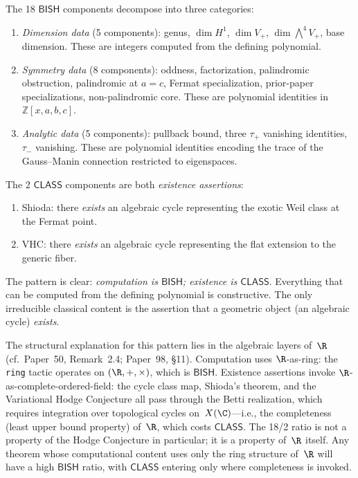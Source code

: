 \documentclass[11pt]{article}
\theoremstyle{plain}
\theoremstyle{definition}
\theoremstyle{remark}
\newcommand{\ZZ}{\mathbb{Z}}
\newcommand{\BISH}{\mathsf{BISH}}
\newcommand{\CLASS}{\mathsf{CLASS}}
\begin{document}
The 18 $\BISH$ components decompose into three categories:
\begin{enumerate}[label=(\roman*),nosep]
\item \emph{Dimension data} (5 components): genus, $\dim H^1$,
  $\dim V_+$, $\dim \bigwedge^4 V_+$, base dimension.  These are
  integers computed from the defining polynomial.
\item \emph{Symmetry data} (8 components): oddness, factorization,
  palindromic obstruction, palindromic at $a = c$, Fermat
  specialization, prior-paper specializations, non-palindromic core.
  These are polynomial identities in $\ZZ[x,a,b,c]$.
\item \emph{Analytic data} (5 components): pullback bound, three
  $\tau_+$ vanishing identities, $\tau_-$ vanishing.  These are
  polynomial identities encoding the trace of the Gauss--Manin
  connection restricted to eigenspaces.
\end{enumerate}

The 2 $\CLASS$ components are both \emph{existence assertions}:
\begin{enumerate}[label=(\roman*),nosep]
\item Shioda: there \emph{exists} an algebraic cycle representing
  the exotic Weil class at the Fermat point.
\item VHC: there \emph{exists} an algebraic cycle representing
  the flat extension to the generic fiber.
\end{enumerate}

The pattern is clear: \emph{computation is $\BISH$; existence is
$\CLASS$}.  Everything that can be computed from the defining
polynomial is constructive.  The only irreducible classical content
is the assertion that a geometric object (an algebraic cycle)
\emph{exists}.

The structural explanation for this pattern lies in the algebraic
layers of~$\R$ (cf.\ Paper~50, Remark~2.4; Paper~98, \S11).
Computation uses $\R$-as-ring: the \texttt{ring} tactic operates on
$(\R, +, \times)$, which is $\BISH$. Existence assertions invoke
$\R$-as-complete-ordered-field: the cycle class map, Shioda's
theorem, and the Variational Hodge Conjecture all pass through the
Betti realization, which requires integration over topological
cycles on~$X(\C)$---i.e., the completeness (least upper bound
property) of~$\R$, which costs $\CLASS$.  The 18/2 ratio is not
a property of the Hodge Conjecture in particular; it is a property
of~$\R$ itself.  Any theorem whose computational content uses only
the ring structure of~$\R$ will have a high $\BISH$ ratio, with
$\CLASS$ entering only where completeness is invoked.
\end{document}
